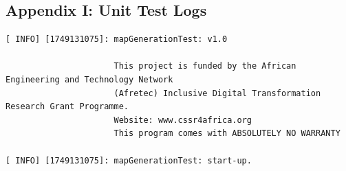 \documentclass{CSSRforAfrica}
\begin{document}
\begin{landscape} 
\section*{Appendix I: Unit Test Logs}

\small  
\begin{verbatim}
[ INFO] [1749131075]: mapGenerationTest: v1.0 

                      This project is funded by the African Engineering and Technology Network
                      (Afretec) Inclusive Digital Transformation Research Grant Programme.
                      Website: www.cssr4africa.org
                      This program comes with ABSOLUTELY NO WARRANTY

[ INFO] [1749131075]: mapGenerationTest: start-up.


\end{verbatim}
\end{landscape}
\end{document}
